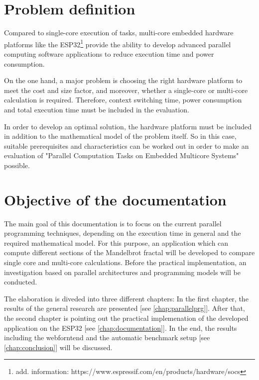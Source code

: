 \section{Problem definition}

Compared to single-core execution of tasks, multi-core embedded hardware platforms like the ESP32\footnote{add. information: https://www.espressif.com/en/products/hardware/socs} provide the ability to develop advanced parallel computing software applications to reduce execution time and power consumption.

On the one hand, a major problem is choosing the right hardware platform to meet the cost and size factor, and moreover, whether a single-core or multi-core calculation is required. Therefore, context switching time, power consumption and total execution time must be included in the evaluation.

In order to develop an optimal solution, the hardware platform must be included in addition to the mathematical model of the problem itself. So in this case, suitable prerequisites and characteristics can be worked out in order to make an evaluation of "Parallel Computation Tasks on Embedded Multicore Systems" possible.

\section{Objective of the documentation}

The main goal of this documentation is to focus on the current parallel programming techniques, depending on the execution time in general and the required mathematical model. For this purpose, an application which can compute different sections of the Mandelbrot fractal \parencite[see][p11]{article18} will be developed to compare single core and multi-core calculations. Before the practical implementation, an investigation based on parallel architectures and programming models will be conducted.

The elaboration is diveded into three different chapters: In the first chapter, the results of the general research are presented [see \ref{chap:parallelprg}]. After that, the second chapter is pointing out the practical implemenation of the developed application on the ESP32 [see \ref{chap:documentation}]. In the end, the results including the webforntend and the automatic benchmark setup [see \ref{chap:conclusion}] will be discussed.